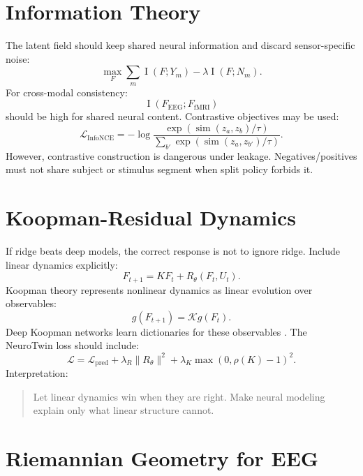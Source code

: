 \documentclass[11pt]{article}
\newcommand{\MI}{\operatorname{I}}
\newcommand{\loss}{\mathcal{L}}
\begin{document}
\section{Information Theory}

The latent field should keep shared neural information and discard sensor-specific noise:
\begin{equation}
\max_F \sum_m \MI(F;Y_m)-\lambda \MI(F;N_m).
\end{equation}
For cross-modal consistency:
\begin{equation}
\MI(F_{\mathrm{EEG}};F_{\mathrm{fMRI}})
\end{equation}
should be high for shared neural content. Contrastive objectives may be used:
\begin{equation}
\loss_{\mathrm{InfoNCE}}=-\log\frac{\exp(\operatorname{sim}(z_a,z_b)/\tau)}{\sum_{b'}\exp(\operatorname{sim}(z_a,z_{b'})/\tau)}.
\end{equation}
However, contrastive construction is dangerous under leakage. Negatives/positives must not share subject or stimulus segment when split policy forbids it.

\section{Koopman-Residual Dynamics}

If ridge beats deep models, the correct response is not to ignore ridge. Include linear dynamics explicitly:
\begin{equation}
F_{t+1}=KF_t+R_\theta(F_t,U_t).
\end{equation}
Koopman theory represents nonlinear dynamics as linear evolution over observables:
\begin{equation}
g(F_{t+1})=\mathcal{K}g(F_t).
\end{equation}
Deep Koopman networks learn dictionaries for these observables \cite{deepkoopman}. The NeuroTwin loss should include:
\begin{equation}
\loss=\loss_{\mathrm{pred}}+\lambda_R\|R_\theta\|^2+\lambda_K\max(0,\rho(K)-1)^2.
\end{equation}
Interpretation:
\begin{quote}
Let linear dynamics win when they are right. Make neural modeling explain only what linear structure cannot.
\end{quote}

\section{Riemannian Geometry for EEG}
\end{document}
